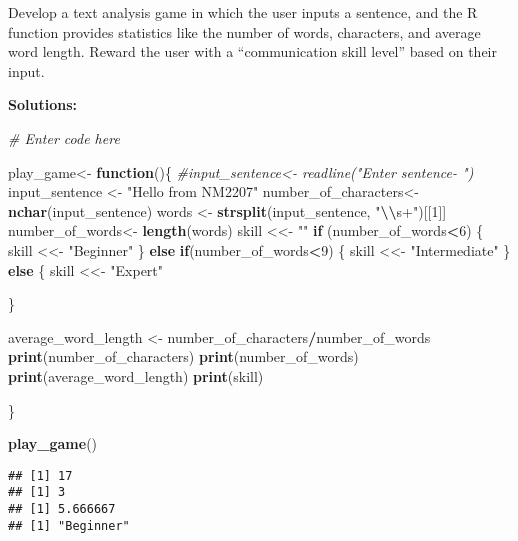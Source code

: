 \documentclass[
]{article}
\newenvironment{Shaded}{\begin{snugshade}}{\end{snugshade}}
\newcommand{\CommentTok}[1]{\textcolor[rgb]{0.56,0.35,0.01}{\textit{#1}}}
\newcommand{\ControlFlowTok}[1]{\textcolor[rgb]{0.13,0.29,0.53}{\textbf{#1}}}
\newcommand{\DecValTok}[1]{\textcolor[rgb]{0.00,0.00,0.81}{#1}}
\newcommand{\FunctionTok}[1]{\textcolor[rgb]{0.13,0.29,0.53}{\textbf{#1}}}
\newcommand{\NormalTok}[1]{#1}
\newcommand{\OtherTok}[1]{\textcolor[rgb]{0.56,0.35,0.01}{#1}}
\newcommand{\SpecialCharTok}[1]{\textcolor[rgb]{0.81,0.36,0.00}{\textbf{#1}}}
\newcommand{\StringTok}[1]{\textcolor[rgb]{0.31,0.60,0.02}{#1}}
\begin{document}
Develop a text analysis game in which the user inputs a sentence, and
the R function provides statistics like the number of words, characters,
and average word length. Reward the user with a ``communication skill
level'' based on their input.

\textbf{Solutions:}

\begin{Shaded}
\begin{Highlighting}[]
\CommentTok{\# Enter code here}

  
\NormalTok{  play\_game}\OtherTok{\textless{}{-}} \ControlFlowTok{function}\NormalTok{()\{}
    \CommentTok{\#input\_sentence\textless{}{-} readline("Enter sentence{-} ") }
\NormalTok{    input\_sentence }\OtherTok{\textless{}{-}} \StringTok{"Hello from NM2207"}
\NormalTok{  number\_of\_characters}\OtherTok{\textless{}{-}} \FunctionTok{nchar}\NormalTok{(input\_sentence)}
\NormalTok{ words }\OtherTok{\textless{}{-}} \FunctionTok{strsplit}\NormalTok{(input\_sentence, }\StringTok{"}\SpecialCharTok{\textbackslash{}\textbackslash{}}\StringTok{s+"}\NormalTok{)[[}\DecValTok{1}\NormalTok{]]}
\NormalTok{  number\_of\_words}\OtherTok{\textless{}{-}} \FunctionTok{length}\NormalTok{(words)}
\NormalTok{  skill }\OtherTok{\textless{}\textless{}{-}} \StringTok{""}
  \ControlFlowTok{if}\NormalTok{ (number\_of\_words}\SpecialCharTok{\textless{}}\DecValTok{6}\NormalTok{) \{}
\NormalTok{    skill }\OtherTok{\textless{}\textless{}{-}} \StringTok{"Beginner"}
\NormalTok{\}}
  \ControlFlowTok{else} \ControlFlowTok{if}\NormalTok{(number\_of\_words}\SpecialCharTok{\textless{}}\DecValTok{9}\NormalTok{) \{}
\NormalTok{    skill }\OtherTok{\textless{}\textless{}{-}} \StringTok{"Intermediate"}
\NormalTok{\}}
  \ControlFlowTok{else}\NormalTok{ \{}
\NormalTok{    skill }\OtherTok{\textless{}\textless{}{-}} \StringTok{"Expert"}

\NormalTok{  \}}
    
\NormalTok{  average\_word\_length }\OtherTok{\textless{}{-}}\NormalTok{ number\_of\_characters}\SpecialCharTok{/}\NormalTok{number\_of\_words}
  \FunctionTok{print}\NormalTok{(number\_of\_characters)}
  \FunctionTok{print}\NormalTok{(number\_of\_words)}
  \FunctionTok{print}\NormalTok{(average\_word\_length)}
  \FunctionTok{print}\NormalTok{(skill)}

  
\NormalTok{  \}}


  \FunctionTok{play\_game}\NormalTok{()}
\end{Highlighting}
\end{Shaded}

\begin{verbatim}
## [1] 17
## [1] 3
## [1] 5.666667
## [1] "Beginner"
\end{verbatim}
\end{document}
